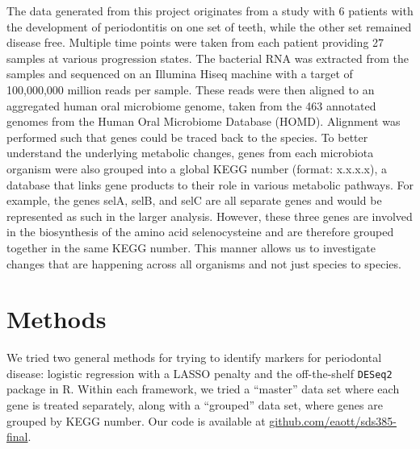 \documentclass{article}
\begin{document}
The data generated from this project originates from a study with 6 patients with the development of periodontitis on one set of teeth, while the other set remained disease free. Multiple time points were taken from each patient providing 27 samples at various progression states. The bacterial RNA was extracted from the samples and sequenced on an Illumina Hiseq machine with a target of 100,000,000 million reads per sample. These reads were then aligned to an aggregated human oral microbiome genome, taken from the 463 annotated genomes from the Human Oral Microbiome Database (HOMD). Alignment was performed such that genes could be traced back to the species. To better understand the underlying metabolic changes, genes from each microbiota organism were also grouped into a global KEGG number (format: x.x.x.x), a database that links gene products to their role in various metabolic pathways. For example, the genes selA, selB, and selC are all separate genes and would be represented as such in the larger analysis. However, these three genes are involved in the biosynthesis of the amino acid selenocysteine and are therefore grouped together in the same KEGG number. This manner allows us to investigate changes that are happening across all organisms and not just species to species.

































\section{Methods}
We tried two general methods for trying to identify markers for periodontal disease: logistic regression with a
LASSO penalty and the off-the-shelf \texttt{DESeq2} package in R. Within each framework, we tried
a ``master'' data set where each gene is treated separately, along with a ``grouped'' data set, where genes are
grouped by KEGG number. Our code is available at \url{github.com/eaott/sds385-final}.
\end{document}
